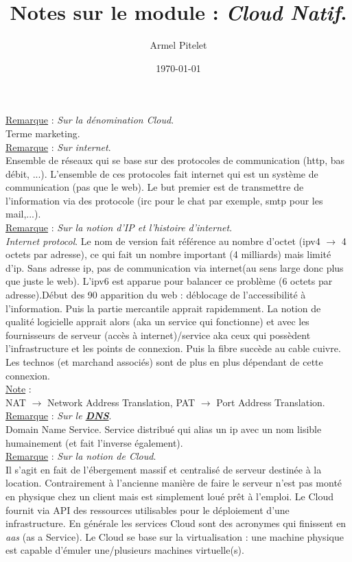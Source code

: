 \documentclass[a4paper,12pt,twoside]{article}
\title{Notes sur le module : \textit{Cloud Natif}.}
\author{Armel Pitelet}
\date{\today}
\newcommand{\urlcolor}{magenta}  %
\newcommand{\keycolor}{purple} %
\newcommand{\rem}[2]{\noindent\underline{Remarque} : \textit{#1}.\\ \indent #2}
\newcommand{\note}[1]{\noindent\underline{Note} : \\ \indent #1}
\newcommand{\keyref}[2]{\hypersetup{urlcolor=\keycolor} \href{#1}{\textbf{#2}}\hypersetup{urlcolor=\urlcolor}}
\begin{document}
\maketitle
\tableofcontents

\rem{Sur la dénomination Cloud}{Terme marketing.}\\

\rem{Sur internet}{Ensemble de réseaux qui se base sur des protocoles de communication (http, bas débit, ...). L'ensemble de ces protocoles fait internet qui est un système de communication (pas que le web). Le but premier est de transmettre de l'information via des protocole (irc pour le chat par exemple, smtp pour les mail,...).}\\

\rem{Sur la notion d'IP et l'histoire d'internet}{\textit{Internet protocol}. Le nom de version fait référence au nombre d'octet (ipv4 $\to$ 4 octets par adresse), ce qui fait un nombre important (4 milliards) mais limité d'ip. Sans adresse ip, pas de communication via internet(au sens large donc plus que juste le web). L'ipv6 est apparue pour balancer ce problème (6 octets par adresse).Début des 90 apparition du web : déblocage de l'accessibilité à l'information. Puis la partie mercantile apprait rapidemment. La notion de qualité logicielle apprait alors (aka un service qui fonctionne) et avec les fournisseurs de serveur (accès à internet)/service aka ceux qui possèdent l'infrastructure et les points de connexion. Puis la fibre succède au cable cuivre. Les technos (et marchand associés) sont de plus en plus dépendant de cette connexion.}\\

\note{NAT $\to$ Network Address Translation, PAT $\to$ Port Address Translation.}\\

\rem{Sur le \keyref{https://fr.wikipedia.org/wiki/Domain_Name_System}{DNS}}{Domain Name Service. Service distribué qui alias un ip avec un nom lisible humainement (et fait l'inverse également).}\\

\rem{Sur la notion de Cloud}{Il s'agit en fait de l'ébergement massif et centralisé de serveur destinée à la location. Contrairement à l'ancienne manière de faire le serveur n'est pas monté en physique chez un client mais est simplement loué prêt à l'emploi. Le Cloud fournit via API des ressources utilisables pour le déploiement d'une infrastructure. En générale les services Cloud sont des acronymes qui finissent en \textit{aas} (as a Service). Le Cloud se base sur la virtualisation : une machine physique est capable d'émuler une/plusieurs machines virtuelle(s).}\\
\end{document}
